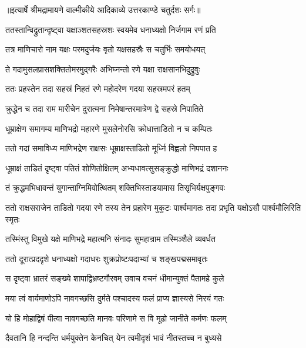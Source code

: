 {॥इत्यार्षे श्रीमद्रामायणे वाल्मीकीये आदिकाव्ये उत्तरकाण्डे चतुर्दशः सर्गः॥}


\twolineshloka
{ततस्तान्विद्रुतान्दृष्ट्वा यक्षाञ्शतसहस्रशः}
{स्वयमेव धनाध्यक्षो निर्जगाम रणं प्रति} %

\twolineshloka
{तत्र माणिचारो नाम यक्षः परमदुर्जयः}
{वृतो यक्षसहस्रैः स चतुर्भिः समयोधयत्} %

\twolineshloka
{ते गदामुसलप्रासशक्तितोमरमुद्गरैः}
{अभिघ्नन्तो रणे यक्षा राक्षसानभिदुद्रुवुः} %

\twolineshloka
{ततः प्रहस्तेन तदा सहस्रं निहतं रणे}
{महोदरेण गदया सहस्रमपरं हतम्} %

\twolineshloka
{क्रुद्धेन च तदा राम मारीचेन दुरात्मना}
{निमेषान्तरमात्रेण द्वे सहस्रे निपातिते} %

\twolineshloka
{धूम्राक्षेण समागम्य माणिभद्रो महारणे}
{मुसलेनोरसि क्रोधात्ताडितो न च कम्पितः} %

\twolineshloka
{ततो गदां समाविध्य माणिभद्रेण राक्षसः}
{धूम्राक्षस्ताडितो मूर्ध्नि विह्वलो निपपात ह} %

\twolineshloka
{धूम्राक्षं ताडितं दृष्ट्वा पतितं शोणितोक्षितम्}
{अभ्यधावत्सुसङ्क्रुद्धो माणिभद्रं दशाननः} %

\twolineshloka
{तं क्रुद्धमभिधावन्तं युगान्ताग्निमिवोत्थितम्}
{शक्तिभिस्ताडयामास तिसृभिर्यक्षपुङ्गवः} %

\threelineshloka
{ततो राक्षसराजेन ताडितो गदया रणे}
{तस्य तेन प्रहारेण मुकुटः पार्श्वमागतः}
{तदा प्रभृति यक्षोऽसौ पार्श्वमौलिरिति स्मृतः} %

\twolineshloka
{तस्मिंस्तु विमुखे यक्षे माणिभद्रे महात्मनि}
{संनादः सुमहान्राम तस्मिञ्शैले व्यवर्धत} %

\twolineshloka
{ततो दूरात्प्रददृशे धनाध्यक्षो गदाधरः}
{शुक्रप्रोष्टःपदाभ्यां च शङ्खपद्मसमावृतः} %

\twolineshloka
{स दृष्ट्वा भ्रातरं सङ्ख्ये शापाद्विभ्रष्टगौरवम्}
{उवाच वचनं धीमान्युक्तं पैतामहे कुले} %

\twolineshloka
{मया त्वं वार्यमाणोऽपि नावगच्छसि दुर्मते}
{पश्चादस्य फलं प्राप्य ज्ञास्यसे निरयं गतः} %

\twolineshloka
{यो हि मोहाद्विषं पीत्वा नावगच्छति मानवः}
{परिणामे स वि मूढो जानीते कर्मणः फलम्} %

\twolineshloka
{दैवतानि हि नन्दन्ति धर्मयुक्तेन केनचित्}
{येन त्वमीदृशं भावं नीतस्तच्च न बुध्यसे} %

